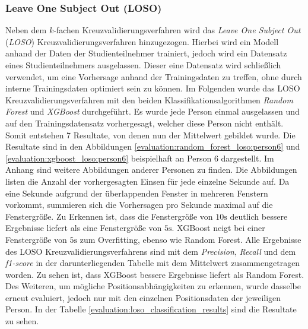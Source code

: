 \subsubsection{Leave One Subject Out (LOSO)}
Neben dem $k$-fachen Kreuzvalidierungsverfahren wird das \textit{Leave One Subject Out} (\textit{LOSO}) Kreuzvalidierungsverfahren hinzugezogen. 
Hierbei wird ein Modell anhand der Daten der Studienteilnehmer trainiert, jedoch wird ein Datensatz eines Studienteilnehmers ausgelassen. 
Dieser eine Datensatz wird schließlich verwendet, um eine Vorhersage anhand der Trainingsdaten zu treffen, ohne durch interne Trainingsdaten optimiert sein zu können.
Im Folgenden wurde das LOSO Kreuzvalidierungsverfahren mit den beiden Klassifikationsalgorithmen \textit{Random Forest} und \textit{XGBoost} durchgeführt. 
Es wurde jede Person einmal ausgelassen und auf den Trainingsdatensatz vorhergesagt, welcher diese Person nicht enthält. 
Somit entstehen 7 Resultate, von denen nun der Mittelwert gebildet wurde.
Die Resultate sind in den Abbildungen \ref{evaluation:random_forest_loso:person6} und \ref{evaluation:xgboost_loso:person6} beispielhaft an Person 6 dargestellt.
Im Anhang sind weitere Abbildungen anderer Personen zu finden.
Die Abbildungen listen die Anzahl der vorhergesagten Einsen für jede einzelne Sekunde auf. 
Da eine Sekunde aufgrund der überlappenden Fenster in mehreren Fenstern vorkommt, summieren sich die Vorhersagen pro Sekunde maximal auf die Fenstergröße.
Zu Erkennen ist, dass die Fenstergröße von $10\si{\s}$ deutlich bessere Ergebnisse liefert als eine Fenstergröße von $5\si{\s}$. 
XGBoost neigt bei einer Fenstergröße von $5\si{\s}$ zum Overfitting, ebenso wie Random Forest. 
Alle Ergebnisse des LOSO Kreuzvalidierungsverfahrens sind mit dem \textit{Precision}, \textit{Recall} und dem \textit{f1-score} in der darunterliegenden Tabelle mit dem Mittelwert zusammengetragen worden. 
Zu sehen ist, dass XGBoost bessere Ergebnisse liefert als Random Forest.
Des Weiteren, um mögliche Positionsabhängigkeiten zu erkennen, wurde dasselbe erneut evaluiert, jedoch nur mit den einzelnen Positionsdaten der jeweiligen Person. 
In der Tabelle \ref{evaluation:loso_classification_results} sind die Resultate zu sehen.

